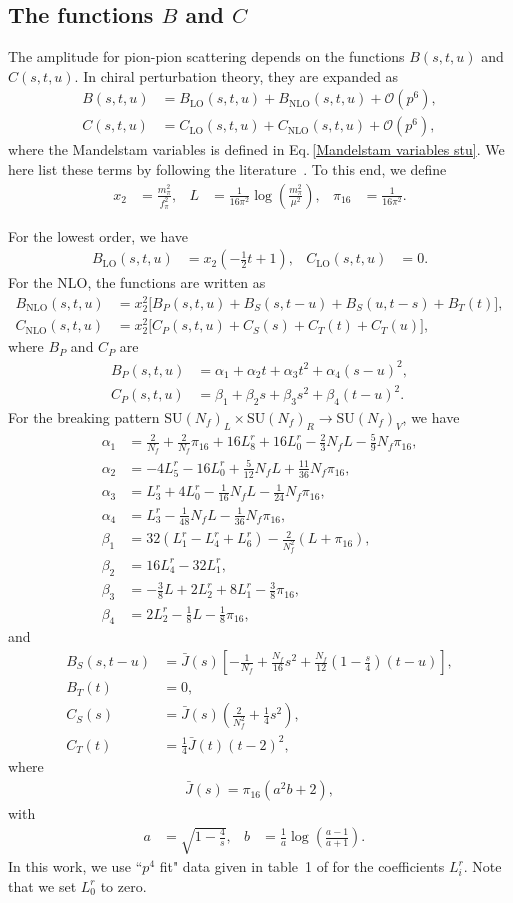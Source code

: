 \documentclass[a4paper,preprint,superscriptaddress,preprintnumbers,nofootinbib]{revtex4}
\newcommand{\SU}{\text{SU}}
\newcommand{\al}[1]{\begin{align}#1\end{align}}
\newcommand{\fn}[1]{\!\left(#1\right)}
\begin{document}
\begin{appendix}
\section{The functions $B$ and $C$}\label{BC functions}
The amplitude for {pion-pion scattering} depends on the functions $B\fn{s,t,u}$ and $C\fn{s,t,u}$.
In {chiral perturbation theory}, they are expanded as
\al{
B\fn{s,t,u}&=B_\text{LO}\fn{s,t,u}+B_\text{NLO}\fn{s,t,u}+{\mathcal O}\fn{p^6},\\
C\fn{s,t,u}&=C_\text{LO}\fn{s,t,u}+C_\text{NLO}\fn{s,t,u}+{\mathcal O}\fn{p^6},
}
where the Mandelstam variables is defined in Eq.\,\eqref{Mandelstam variables stu}.
We here list these terms by following the literature~\cite{Bijnens:2011fm}.
To this end, we define 
\al{
x_2&=\frac{m_\pi^2}{f_\pi^2},&
L&=\frac{1}{16\pi^2}\log\fn{\frac{m_\pi^2}{\mu^2}},&
\pi_{16}&=\frac{1}{16\pi^2}.
}

For the lowest order, we have
\al{
B_\text{LO}\fn{s,t,u}&=x_2\left( -\frac{1}{2}t+1\right),&
C_\text{LO}\fn{s,t,u}&=0.
}
For the NLO, the functions are written as
\al{
B_\text{NLO}\fn{s,t,u}&=x_2^2\big[ B_P\fn{s,t,u}+B_S\fn{s,t-u}+B_S\fn{u,t-s}+B_T\fn{t}\big],\\
C_\text{NLO}\fn{s,t,u}&=x_2^2\big[ C_P\fn{s,t,u}+C_S\fn{s}+C_T\fn{t}+C_T\fn{u}\big],
}
where $B_P$ and $C_P$ are
\al{
B_P\fn{s,t,u}&=\alpha_1+\alpha_2 t +\alpha_3 t^2+\alpha_4(s-u)^2,\\
C_P\fn{s,t,u}&=\beta_1+\beta_2 s +\beta_3 s^2 +\beta_4 (t-u)^2.
}
For the breaking pattern $\SU\fn{N_f}_L\times \SU\fn{N_f}_R\to \SU\fn{N_f}_V$, we have
\al{
\alpha_1&=\frac{2}{N_f}+\frac{2}{N_f}\pi_{16}+16L_8^r+16L_0^r-\frac{2}{3}N_f L-\frac{5}{9}N_f\pi_{16},\\
\alpha_2&=-4L_5^r -16L_0^r +\frac{5}{12}N_fL + \frac{11}{36}N_f \pi_{16},\\
\alpha_3&=L_3^r +4L_0^r -\frac{1}{16}N_fL -\frac{1}{24}N_f\pi_{16},\\
\alpha_4&=L_3^r -\frac{1}{48}N_fL -\frac{1}{36}N_f\pi_{16},\\
\beta_1&=32(L_1^r-L_4^r +L_6^r)-\frac{2}{N_f^2}(L+\pi_{16}),\\
\beta_2&=16L_4^r -32L_1^r,\\
\beta_3&=-\frac{3}{8}L +2L_2^r +8L_1^r -\frac{3}{8}\pi_{16},\\
\beta_4&=2L_2^r -\frac{1}{8}L-\frac{1}{8}\pi_{16},
}
and
\al{
B_S\fn{s,t-u}&={\bar J}\fn{s}\left[ -\frac{1}{N_f} +\frac{N_f}{16}s^2 +\frac{N_f}{12}\left(1-\frac{s}{4}\right) (t-u) \right],\\
B_T\fn{t}&=0,\\
C_S\fn{s}&= {\bar J\fn{s}}\left( \frac{2}{N_f^2} +\frac{1}{4}s^2\right),\\
C_T\fn{t}&=\frac{1}{4}{\bar J}\fn{t} (t-2)^2,
}
where
\al{
{\bar J}\fn{s}=\pi_{16} (a ^2b +2),
}
with
\al{
a&=\sqrt{1-\frac{4}{s}},&
b&=\frac{1}{a}\log\fn{\frac{a-1}{a+1}}.&
}
In this work, we use ``$p^4$ fit" data given in table~1 of \cite{Bijnens:2014lea} for the coefficients $L_i^r$.
Note that we set $L_0^r$ to zero.
\end{appendix}






%
%
%
\end{document}
